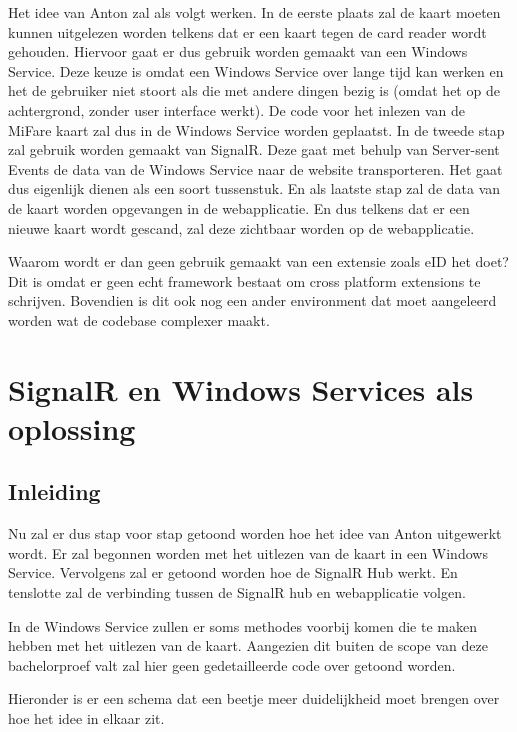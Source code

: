 Het idee van Anton zal als volgt werken. In de eerste plaats zal de kaart moeten kunnen uitgelezen worden telkens dat er een kaart tegen de card reader wordt gehouden. Hiervoor gaat er dus gebruik worden gemaakt van een Windows Service. Deze keuze is omdat een Windows Service over lange tijd kan werken en het de gebruiker niet stoort als die met andere dingen bezig is (omdat het op de achtergrond, zonder user interface werkt). De code voor het inlezen van de MiFare kaart zal dus in de Windows Service worden geplaatst. In de tweede stap zal gebruik worden gemaakt van SignalR. Deze gaat met behulp van Server-sent Events de data van de Windows Service naar de website transporteren. Het gaat dus eigenlijk dienen als een soort tussenstuk. En als laatste stap zal de data van de kaart worden opgevangen in de webapplicatie. En dus telkens dat er een nieuwe kaart wordt gescand, zal deze zichtbaar worden op de webapplicatie. 

Waarom wordt er dan geen gebruik gemaakt van een extensie zoals eID het doet? Dit is omdat er geen echt framework bestaat om cross platform extensions te schrijven. Bovendien is dit ook nog een ander environment dat moet aangeleerd worden wat de codebase complexer maakt.




\section{SignalR en Windows Services als oplossing}

\subsection{Inleiding}
Nu zal er dus stap voor stap getoond worden hoe het idee van Anton uitgewerkt wordt. Er zal begonnen worden met het uitlezen van de kaart in een Windows Service. Vervolgens zal er getoond worden hoe de SignalR Hub werkt. En tenslotte zal de verbinding tussen de SignalR hub en webapplicatie volgen.   

In de Windows Service zullen er soms methodes voorbij komen die te maken hebben met het uitlezen van de kaart. Aangezien dit buiten de scope van deze bachelorproef valt zal hier geen gedetailleerde code over getoond worden. 

Hieronder is er een schema dat een beetje meer duidelijkheid moet brengen over hoe het idee in elkaar zit. 

